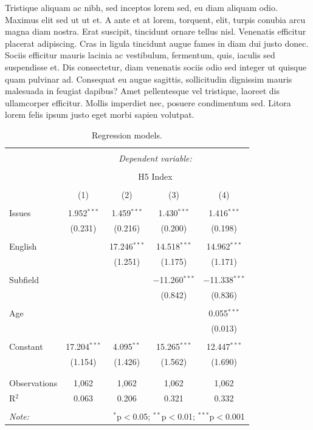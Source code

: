 \documentclass[
  12,
]{article}
\begin{document}
Tristique aliquam ac nibh, sed inceptos lorem sed, eu diam aliquam odio.
Maximus elit sed ut ut et. A ante et at lorem, torquent, elit, turpis
conubia arcu magna diam nostra. Erat suscipit, tincidunt ornare tellus
nisl. Venenatis efficitur placerat adipiscing. Cras in ligula tincidunt
augue fames in diam dui justo donec. Sociis efficitur mauris lacinia ac
vestibulum, fermentum, quis, iaculis sed suspendisse et. Dis
consectetur, diam venenatis sociis odio sed integer ut quisque quam
pulvinar ad. Consequat eu augue sagittis, sollicitudin dignissim mauris
malesuada in feugiat dapibus? Amet pellentesque vel tristique, laoreet
dis ullamcorper efficitur. Mollis imperdiet nec, posuere condimentum
sed. Litora lorem felis ipsum justo eget morbi sapien volutpat.

\begin{table}[!htbp] \centering 
  \caption{Regression models.} 
  \label{r_table} 
\begin{tabular}{@{\extracolsep{5pt}}lcccc} 
\\[-1.8ex]\hline 
\hline \\[-1.8ex] 
 & \multicolumn{4}{c}{\textit{Dependent variable:}} \\ 
\cline{2-5} 
\\[-1.8ex] & \multicolumn{4}{c}{H5 Index} \\ 
\\[-1.8ex] & (1) & (2) & (3) & (4)\\ 
\hline \\[-1.8ex] 
 Issues & 1.952$^{***}$ & 1.459$^{***}$ & 1.430$^{***}$ & 1.416$^{***}$ \\ 
  & (0.231) & (0.216) & (0.200) & (0.198) \\ 
  & & & & \\ 
 English &  & 17.246$^{***}$ & 14.518$^{***}$ & 14.962$^{***}$ \\ 
  &  & (1.251) & (1.175) & (1.171) \\ 
  & & & & \\ 
 Subfield &  &  & $-$11.260$^{***}$ & $-$11.338$^{***}$ \\ 
  &  &  & (0.842) & (0.836) \\ 
  & & & & \\ 
 Age &  &  &  & 0.055$^{***}$ \\ 
  &  &  &  & (0.013) \\ 
  & & & & \\ 
 Constant & 17.204$^{***}$ & 4.095$^{**}$ & 15.265$^{***}$ & 12.447$^{***}$ \\ 
  & (1.154) & (1.426) & (1.562) & (1.690) \\ 
  & & & & \\ 
\hline \\[-1.8ex] 
Observations & 1,062 & 1,062 & 1,062 & 1,062 \\ 
R$^{2}$ & 0.063 & 0.206 & 0.321 & 0.332 \\ 
\hline 
\hline \\[-1.8ex] 
\textit{Note:}  & \multicolumn{4}{r}{$^{*}$p$<$0.05; $^{**}$p$<$0.01; $^{***}$p$<$0.001} \\ 
\end{tabular} 
\end{table}
\end{document}
